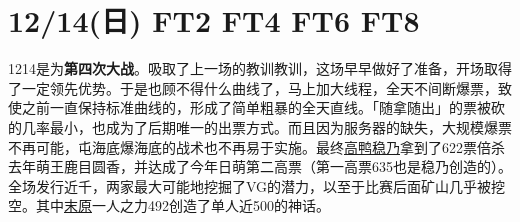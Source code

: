 \section{12/14(日) FT2 FT4 FT6 FT8}



1214是为\textbf{第四次大战}。吸取了上一场的教训教训，这场早早做好了准备，开场取得了一定领先优势。于是也顾不得什么曲线了，马上加大线程，全天不间断爆票，致使之前一直保持标准曲线的，形成了简单粗暴的全天直线。「随拿随出」的票被砍的几率最小，也成为了后期唯一的出票方式。而且因为服务器的缺失，大规模爆票不再可能，屯海底爆海底的战术也不再易于实施。最终\uline{高鸭稳乃}拿到了622票倍杀去年萌王鹿目圆香，并达成了今年日萌第二高票（第一高票635也是稳乃创造的）。全场发行近千，两家最大可能地挖掘了VG的潜力，以至于比赛后面矿山几乎被挖空。其中\uline{末原}一人之力492创造了单人近500的神话。

